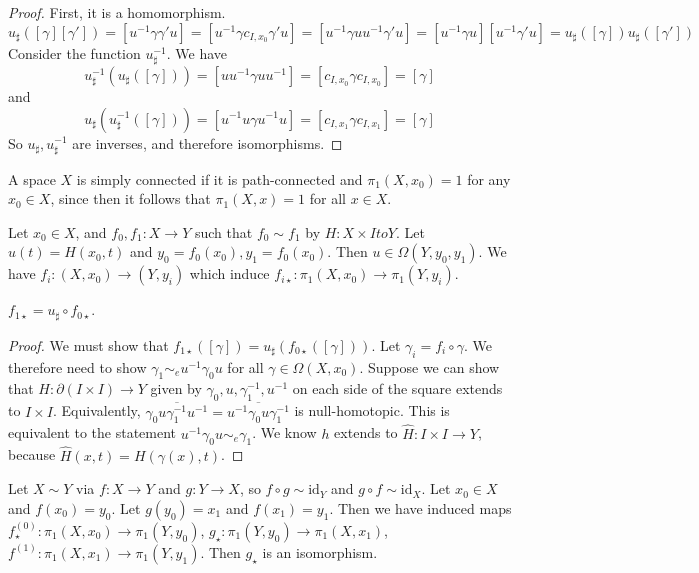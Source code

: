 \begin{proof}
	First, it is a homomorphism.
	\[ u_\sharp([\gamma][\gamma']) = [u^{-1}\gamma \gamma' u] = [u^{-1}\gamma c_{I,x_0}\gamma' u] = [u^{-1}\gamma u u^{-1} \gamma' u] = [u^{-1}\gamma u][u^{-1}\gamma' u] = u_\sharp([\gamma])u_\sharp([\gamma']) \]
	Consider the function \( u^{-1}_\sharp \).
	We have
	\[ u^{-1}_\sharp(u_\sharp([\gamma])) = [uu^{-1}\gamma uu^{-1}] = [c_{I,x_0} \gamma c_{I,x_0}] = [\gamma] \]
	and
	\[ u_\sharp(u^{-1}_\sharp([\gamma])) = [u^{-1}u\gamma u^{-1}u] = [c_{I,x_1} \gamma c_{I,x_1}] = [\gamma] \]
	So \( u_\sharp, u^{-1}_\sharp \) are inverses, and therefore isomorphisms.
\end{proof}
\begin{corollary}
	A space \( X \) is simply connected if it is path-connected and \( \pi_1(X,x_0) = 1 \) for any \( x_0 \in X \), since then it follows that \( \pi_1(X,x) = 1 \) for all \( x \in X \).
\end{corollary}
Let \( x_0 \in X \), and \( f_0, f_1 \colon X \to Y \) such that \( f_0 \sim f_1 \) by \( H \colon X \times I to Y \).
Let \( u(t) = H(x_0,t) \) and \( y_0 = f_0(x_0), y_1 = f_0(x_0) \).
Then \( u \in \Omega(Y,y_0,y_1) \).
We have \( f_i \colon (X,x_0) \to (Y,y_i) \) which induce \( f_{i\star} \colon \pi_1(X,x_0) \to \pi_1(Y,y_i) \).
\begin{theorem}
	\( f_{1\star} = u_\sharp \circ f_{0\star} \).
\end{theorem}
\begin{proof}
	We must show that \( f_{1\star}([\gamma]) = u_\sharp(f_{0\star}([\gamma])) \).
	Let \( \gamma_i = f_i \circ \gamma \).
	We therefore need to show \( \gamma_1 \sim_e u^{-1} \gamma_0 u \) for all \( \gamma \in \Omega(X,x_0) \).
	Suppose we can show that \( H \colon \partial (I \times I) \to Y \) given by \( \gamma_0, u, \gamma_1^{-1}, u^{-1} \) on each side of the square extends to \( I \times I \).
	Equivalently, \( \overline{\gamma_0 u \gamma_1^{-1} u^{-1}} = \overline{u^{-1}\gamma_0 u \gamma_1^{-1}} \) is null-homotopic.
	This is equivalent to the statement \( u^{-1}\gamma_0 u \sim_e \gamma_1 \).
	We know \( h \) extends to \( \hat H \colon I \times I \to Y \), because \( \hat H(x,t) = H(\gamma(x),t) \).
\end{proof}
\begin{corollary}
	Let \( X \sim Y \) via \( f : X \to Y \) and \( g \colon Y \to X \), so \( f \circ g \sim \mathrm{id}_Y \) and \( g \circ f \sim \mathrm{id}_X \).
	Let \( x_0 \in X \) and \( f(x_0) = y_0 \).
	Let \( g(y_0) = x_1 \) and \( f(x_1) = y_1 \).
	Then we have induced maps \( f^{(0)}_\star \colon \pi_1(X,x_0) \to \pi_1(Y,y_0) \), \( g_\star \colon \pi_1(Y,y_0) \to \pi_1(X,x_1) \), \( f^{(1)} \colon \pi_1(X,x_1) \to \pi_1(Y,y_1) \).
	Then \( g_\star \) is an isomorphism.
\end{corollary}

